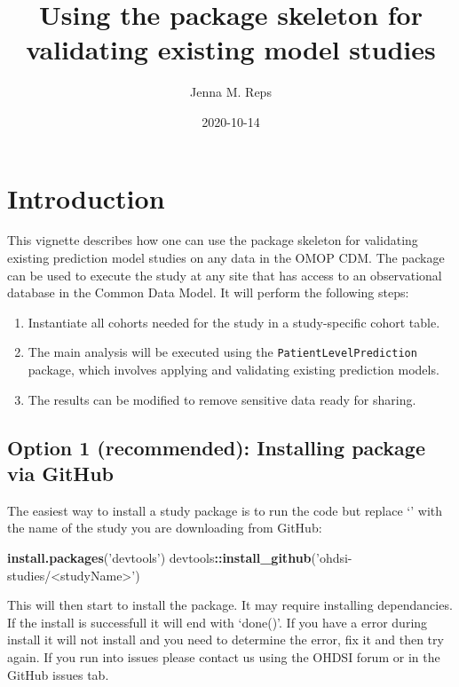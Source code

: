 \documentclass[
]{article}
\title{Using the package skeleton for validating existing model studies}
\author{Jenna M. Reps}
\date{2020-10-14}
\newenvironment{Shaded}{\begin{snugshade}}{\end{snugshade}}
\newcommand{\KeywordTok}[1]{\textcolor[rgb]{0.13,0.29,0.53}{\textbf{#1}}}
\newcommand{\NormalTok}[1]{#1}
\newcommand{\OperatorTok}[1]{\textcolor[rgb]{0.81,0.36,0.00}{\textbf{#1}}}
\newcommand{\StringTok}[1]{\textcolor[rgb]{0.31,0.60,0.02}{#1}}
\providecommand{\tightlist}{%
  \setlength{\itemsep}{0pt}\setlength{\parskip}{0pt}}
\begin{document}
\maketitle

{
\setcounter{tocdepth}{2}
\tableofcontents
}
\hypertarget{introduction}{%
\section{Introduction}\label{introduction}}

This vignette describes how one can use the package skeleton for
validating existing prediction model studies on any data in the OMOP
CDM. The package can be used to execute the study at any site that has
access to an observational database in the Common Data Model. It will
perform the following steps:

\begin{enumerate}
\def\labelenumi{\arabic{enumi}.}
\tightlist
\item
  Instantiate all cohorts needed for the study in a study-specific
  cohort table.
\item
  The main analysis will be executed using the
  \texttt{PatientLevelPrediction} package, which involves applying and
  validating existing prediction models.
\item
  The results can be modified to remove sensitive data ready for
  sharing.
\end{enumerate}

\hypertarget{option-1-recommended-installing-package-via-github}{%
\subsection{Option 1 (recommended): Installing package via
GitHub}\label{option-1-recommended-installing-package-via-github}}

The easiest way to install a study package is to run the code but
replace `' with the name of the study you are downloading from GitHub:

\begin{Shaded}
\begin{Highlighting}[]
\KeywordTok{install.packages}\NormalTok{(}\StringTok{'devtools'}\NormalTok{)}
\NormalTok{devtools}\OperatorTok{::}\KeywordTok{install_github}\NormalTok{(}\StringTok{'ohdsi-studies/<studyName>'}\NormalTok{)}
\end{Highlighting}
\end{Shaded}

This will then start to install the package. It may require installing
dependancies. If the install is successfull it will end with `done()'.
If you have a error during install it will not install and you need to
determine the error, fix it and then try again. If you run into issues
please contact us using the OHDSI forum or in the GitHub issues tab.
\end{document}
